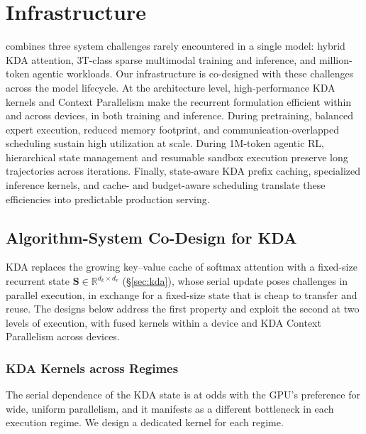 \section{Infrastructure}



 combines three system challenges rarely encountered in a single model: hybrid KDA attention, 3T-class sparse multimodal training and inference, and million-token agentic workloads. 
Our infrastructure is co-designed with these challenges across the model lifecycle. 
At the architecture level, high-performance KDA kernels and Context Parallelism make the recurrent formulation efficient within and across devices, in both training and inference.
During pretraining, balanced expert execution, reduced memory footprint, and communication-overlapped scheduling sustain high utilization at scale.
During 1M-token agentic RL, hierarchical state management and resumable sandbox execution preserve long trajectories across iterations. 
Finally, state-aware KDA prefix caching, specialized inference kernels, and cache- and budget-aware scheduling translate these efficiencies into predictable production serving.


\subsection{Algorithm-System Co-Design for KDA}
\label{sec:kda-codesign}

KDA replaces the growing key--value cache of softmax attention with a fixed-size recurrent state $\mathbf{S}\in\mathbb{R}^{d_k\times d_v}$ (\S\ref{sec:kda}), whose serial update poses challenges in parallel execution, in exchange for a fixed-size state that is cheap to transfer and reuse.
The designs below address the first property and exploit the second at two levels of execution, with fused kernels within a device and KDA Context Parallelism across devices.

\subsubsection{KDA Kernels across Regimes}
The serial dependence of the KDA state is at odds with the GPU's preference for wide, uniform parallelism, and it manifests as a different bottleneck in each execution regime.
We design a dedicated kernel for each regime.

